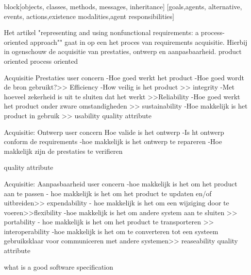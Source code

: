 block[objects, classes, methods, messages, inheritance]
[goals,agents, alternative, events, actions,existence modalities,agent responsibilities]


Het artikel "representing and using nonfunctional requirements: a process-oriented approach"" gaat in op een het proces van requirements acquisitie. Hierbij in ogenschouw de acquisitie van prestaties, ontwerp en aanpasbaarheid.
product oriented
process oriented


Acquisitie Prestaties
user concern
-Hoe goed werkt het product
-Hoe goed wordt de bron gebruikt?>> Efficiency
-How veilig is het product >> integrity
-Met hoeveel zekerheid is uit  te sluiten dat het werkt >>Reliability
-Hoe goed werkt het product onder zware omstandigheden >> sustainability
-Hoe makkelijk is het product in gebruik >> usability
quality attribute


Acquisitie: Ontwerp
user concern
Hoe valide is het ontwerp
-Is ht ontwerp conform de requirements
-hoe makkelijk is het ontwerp te repareren
-Hoe makkelijk zijn de prestaties te verifieren

quality attribute


Acquisitie: Aanpasbaarheid
user concern
-hoe makkelijk is het om het product aan te passen
- hoe makkelijk is het om het product te updaten en/of uitbreiden>> expendability
- hoe makkelijk is het om een wijziging door te voeren>>flexibility
-hoe makkelijk is het om andere system aan te sluiten >> portability
- hoe makkelijk is het om het product te transporteren >> interoperability
-hoe makkelijk is het om te converteren tot een systeem gebruiksklaar voor communiceren met andere systemen>> reaseability
quality attribute




 \cite{jonkerTreurKlush200informativeAgents}
\cite{boehmBoseLeeRequirementsNegotiations}
\cite{muHungJinLiu2013inconsistencyReqs}
\cite{hunterNuseibeh1996manageSpecs}
\cite{myloloupos1992representingReqs}
\cite{zavePamela4darkCorners}
\cite{zavePAmela1997regEngineering}


what is a good software specification

\cite{fvaandrager2322010Goodmodel}
\cite{onix01102022devopmodel}
\cite{sulemani04012021softwareprocesmodel}
\cite{globalluxsoft18102017softdev}
\cite{wiegers30052022SRS}
\cite{muller06092020goodspecification}
\cite{informit30062008reqmanagement}
\cite{altexsoft15092020writingSRS}



